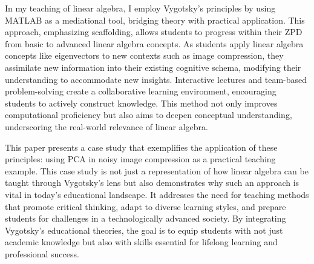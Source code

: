 \documentclass{article}
\begin{document}
In my teaching of linear algebra, I employ Vygotsky's principles by using MATLAB as a mediational tool, bridging theory with practical application. 
This approach, emphasizing scaffolding, allows students to progress within their ZPD from basic to advanced linear algebra concepts. 
As students apply linear algebra concepts like eigenvectors to new contexts such as image compression, they assimilate new information into their existing cognitive schema, modifying their understanding to accommodate new insights.
Interactive lectures and team-based problem-solving create a collaborative learning environment, encouraging students to actively construct knowledge. 
This method not only improves computational proficiency but also aims to deepen conceptual understanding, underscoring the real-world relevance of linear algebra.

This paper presents a case study that exemplifies the application of these principles: using PCA in noisy image compression as a practical teaching example. 
This case study is not just a representation of how linear algebra can be taught through Vygotsky's lens but also demonstrates why such an approach is vital in today's educational landscape. 
It addresses the need for teaching methods that promote critical thinking, adapt to diverse learning styles, and prepare students for challenges in a technologically advanced society. 
By integrating Vygotsky's educational theories, the goal is to equip students with not just academic knowledge but also with skills essential for lifelong learning and professional success.


\end{document}
